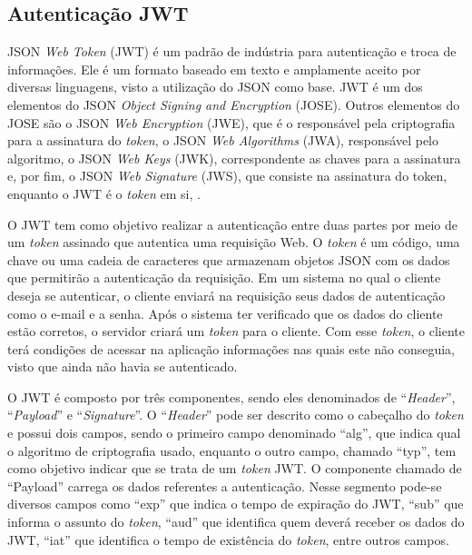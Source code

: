\documentclass[
    12pt,               %
    openright,          %
    oneside,
    a4paper,            %
    BIBLATEX,           %
    TODO,               %
    english,            %
    brazil              %
    ]{ifsp-spo-inf-ctds}
\begin{document}
        \subsection{Autenticação JWT}

            JSON \emph{Web Token} (JWT) é um padrão de indústria para autenticação e troca de informações. Ele é um formato baseado em texto e amplamente aceito por diversas linguagens, visto a utilização do JSON como base. JWT é um dos elementos do JSON \emph{Object Signing and Encryption} (JOSE). Outros elementos do JOSE são o JSON \emph{Web Encryption} (JWE), que é o responsável pela criptografia para a assinatura do \emph{token}, o JSON \emph{Web Algorithms} (JWA), responsável pelo algoritmo, o JSON \emph{Web Keys} (JWK), correspondente as chaves para a assinatura e, por fim, o JSON \emph{Web Signature} (JWS), que consiste na assinatura do token, enquanto o JWT é o \emph{token} em si, .

            O JWT tem como objetivo realizar a autenticação entre duas partes por meio de um \emph{token} assinado que autentica uma requisição Web. O \emph{token} é um código, uma chave ou uma cadeia de caracteres que armazenam objetos JSON com os dados que permitirão a autenticação da requisição.
            Em um sistema no qual o cliente deseja se autenticar, o cliente enviará na requisição seus dados de autenticação como o e-mail e a senha. Após o sistema ter verificado que os dados do cliente estão corretos, o servidor criará um \emph{token} para o cliente. Com esse \emph{token}, o cliente terá condições de acessar na aplicação informações nas quais este não conseguia, visto que ainda não havia se autenticado. 

            O JWT é composto por três componentes, sendo eles denominados de “\emph{Header}”, “\emph{Payload}” e “\emph{Signature}”. O “\emph{Header}” pode ser descrito como o cabeçalho do \emph{token} e possui dois campos, sendo o primeiro campo denominado “alg”, que indica qual o algoritmo de criptografia usado, enquanto o outro campo, chamado “typ”, tem como objetivo indicar que se trata de um \emph{token} JWT. 
            O componente chamado de “Payload” carrega os dados referentes a autenticação. Nesse segmento pode-se diversos campos como “exp” que indica o tempo de expiração do JWT, “sub” que informa o assunto do \emph{token}, “aud” que identifica quem deverá receber os dados do JWT, “iat” que identifica o tempo de existência do \emph{token}, entre outros campos.
\end{document}
